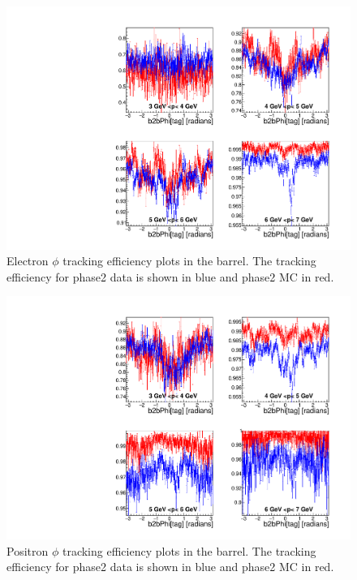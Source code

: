 \documentclass[a4paper,11pt,twosided,final,german,openbib,pdftex,listof=totoc,bibliography=totoc]{scrbook}
\begin{document}
\begin{figure}[!htbp]
	\centering
	\includegraphics[width=\textwidth]{Plots/master/xPMPhiemBarrel}
	\caption[Momentum $\phi$ Electron Barrel Efficiency Phase2]{Electron $\phi$ tracking efficiency plots in the barrel. The tracking efficiency for phase2 data is shown in blue and phase2 MC in red.}
	\label{plt:xPMPhiemBarrel}
\end{figure}




\begin{figure}[!htbp]
	\centering
	\includegraphics[width=\textwidth]{Plots/master/xPMPhiepBarrel}
	\caption[Momentum $\phi$ Positron Barrel Efficiency Phase2]{Positron $\phi$ tracking efficiency plots in the barrel. The tracking efficiency for phase2 data is shown in blue and phase2 MC in red.}
		\label{plt:xPMPhiepBarrel}
\end{figure}
\end{document}
